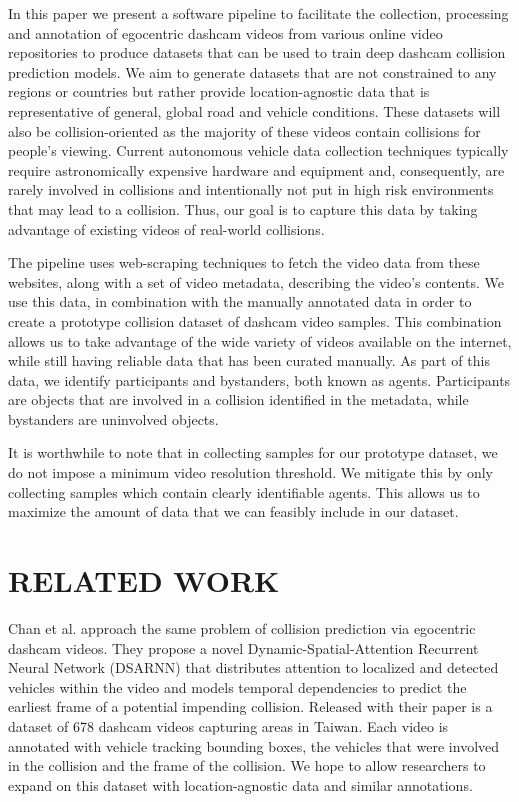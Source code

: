 \documentclass[letterpaper, 10 pt, conference]{ieeeconf}
\begin{document}
In this paper we present a software pipeline to facilitate the collection, processing and annotation of egocentric dashcam videos from various online video repositories to produce datasets that can be used to train deep dashcam collision prediction models.
We aim to generate datasets that are not constrained to any regions or countries but rather provide location-agnostic data that is representative of general, global road and vehicle conditions.
These datasets will also be collision-oriented as the majority of these videos contain collisions for people's viewing.
Current autonomous vehicle data collection techniques typically require astronomically expensive hardware and equipment and, consequently, are rarely involved in collisions and intentionally not put in high risk environments that may lead to a collision.
Thus, our goal is to capture this data by taking advantage of existing videos of real-world collisions. 

The pipeline uses web-scraping techniques to fetch the video data from these websites, along with a set of video metadata, describing the video's contents.
We use this data, in combination with the manually annotated data in order to create a prototype collision dataset of dashcam video samples.
This combination allows us to take advantage of the wide variety of videos available on the internet, while still having reliable data that has been curated manually.
As part of this data, we identify participants and bystanders, both known as agents. Participants are objects that are involved in a collision identified in the metadata, while bystanders are uninvolved objects. 

It is worthwhile to note that in collecting samples for our prototype dataset, we do not impose a minimum video resolution threshold. We mitigate this by only collecting samples which contain clearly identifiable agents. This allows us to maximize the amount of data that we can feasibly include in our dataset. 

\section{RELATED WORK}

Chan et al. \cite{chan2016anticipating} approach the same problem of collision prediction via egocentric dashcam videos. They propose a novel Dynamic-Spatial-Attention Recurrent Neural Network (DSARNN) that distributes attention to localized and detected vehicles within the video and models temporal dependencies to predict the earliest frame of a potential impending collision. Released with their paper is a dataset of 678 dashcam videos capturing areas in Taiwan. Each video is annotated with vehicle tracking bounding boxes, the vehicles that were involved in the collision and the frame of the collision. We hope to allow researchers to expand on this dataset with location-agnostic data and similar annotations.
\end{document}
